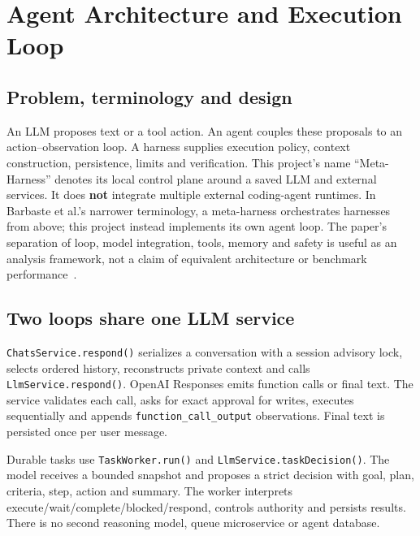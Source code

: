 \chapter{Agent Architecture and Execution Loop}
\section{Problem, terminology and design}
An LLM proposes text or a tool action. An agent couples these proposals to an action--observation loop. A harness supplies execution policy, context construction, persistence, limits and verification. This project's name ``Meta-Harness'' denotes its local control plane around a saved LLM and external services. It does \textbf{not} integrate multiple external coding-agent runtimes. In Barbaste et al.'s narrower terminology, a meta-harness orchestrates harnesses from above; this project instead implements its own agent loop. The paper's separation of loop, model integration, tools, memory and safety is useful as an analysis framework, not a claim of equivalent architecture or benchmark performance~\cite{harness}.
\section{Two loops share one LLM service}
\texttt{ChatsService.respond()} serializes a conversation with a session advisory lock, selects ordered history, reconstructs private context and calls \texttt{LlmService.respond()}. OpenAI Responses emits function calls or final text. The service validates each call, asks for exact approval for writes, executes sequentially and appends \texttt{function\_call\_output} observations. Final text is persisted once per user message.

Durable tasks use \texttt{TaskWorker.run()} and \texttt{LlmService.taskDecision()}. The model receives a bounded snapshot and proposes a strict decision with goal, plan, criteria, step, action and summary. The worker interprets execute/wait/complete/blocked/respond, controls authority and persists results. There is no second reasoning model, queue microservice or agent database.
